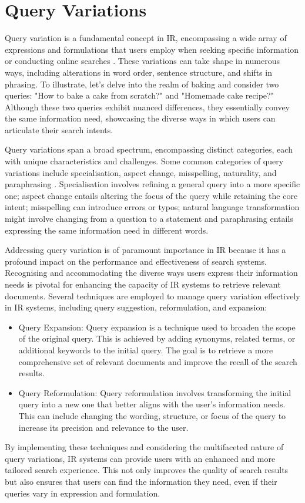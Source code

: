 \section{Query Variations}
Query variation is a fundamental concept in IR, encompassing a wide array of expressions and formulations that users employ when seeking specific information or conducting online searches \cite{zendel}. These variations can take shape in numerous ways, including alterations in word order, sentence structure, and shifts in phrasing. To illustrate, let's delve into the realm of baking and consider two queries: "How to bake a cake from scratch?" and "Homemade cake recipe?" Although these two queries exhibit nuanced differences, they essentially convey the same information need, showcasing the diverse ways in which users can articulate their search intents.

Query variations span a broad spectrum, encompassing distinct categories, each with unique characteristics and challenges. Some common categories of query variations include specialisation, aspect change, misspelling, naturality, and paraphrasing \cite{penha2022}. Specialisation involves refining a general query into a more specific one; aspect change entails altering the focus of the query while retaining the core intent; misspelling can introduce errors or typos; natural language transformation might involve changing from a question to a statement and paraphrasing entails expressing the same information need in different words.

Addressing query variation is of paramount importance in IR because it has a profound impact on the performance and effectiveness of search systems. Recognising and accommodating the diverse ways users express their information needs is pivotal for enhancing the capacity of IR systems to retrieve relevant documents. Several techniques are employed to manage query variation effectively in IR systems, including query suggestion, reformulation, and expansion:
\begin{itemize}
    \item Query Expansion: Query expansion is a technique used to broaden the scope of the original query. This is achieved by adding synonyms, related terms, or additional keywords to the initial query. The goal is to retrieve a more comprehensive set of relevant documents and improve the recall of the search results.
    \item Query Reformulation: Query reformulation involves transforming the initial query into a new one that better aligns with the user's information needs. This can include changing the wording, structure, or focus of the query to increase its precision and relevance to the user.
\end{itemize}

By implementing these techniques and considering the multifaceted nature of query variations, IR systems can provide users with an enhanced and more tailored search experience. This not only improves the quality of search results but also ensures that users can find the information they need, even if their queries vary in expression and formulation.